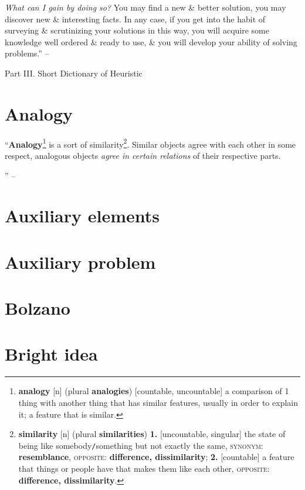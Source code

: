 \documentclass[oneside]{book}
\numberwithin{equation}{section}
\begin{document}
\textit{What can I gain by doing so?} You may find a new \& better solution, you may discover new \& interesting facts. In any case, if you get into the habit of surveying \& scrutinizing your solutions in this way, you will acquire some knowledge well ordered \& ready to use, \& you will develop your ability of solving problems.'' -- \cite[p. 35]{Polya2014}

\begin{center}
	\huge Part III. Short Dictionary of Heuristic
\end{center}

\section{Analogy}
``\textbf{Analogy}\footnote{\textbf{analogy} [n] (plural \textbf{analogies}) [countable, uncountable] a comparison of 1 thing with another thing that has similar features, usually in order to explain it; a feature that is similar.} is a sort of similarity\footnote{\textbf{similarity} [n] (plural \textbf{similarities}) \textbf{1.} [uncountable, singular] the state of being like somebody\texttt{/}something but not exactly the same, \textsc{synonym}: \textbf{resemblance}, \textsc{opposite}: \textbf{difference, dissimilarity}; \textbf{2.} [countable] a feature that things or people have that makes them like each other, \textsc{opposite}: \textbf{difference, dissimilarity}.}. Similar objects agree with each other in some respect, analogous objects \textit{agree in certain relations} of their respective parts.

'' -- \cite[pp. 37--]{Polya2014}

\section{Auxiliary elements}

\section{Auxiliary problem}

\section{Bolzano}

\section{Bright idea}
\end{document}
